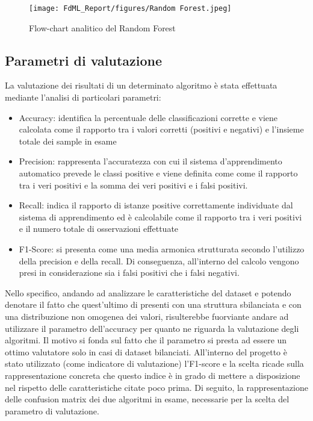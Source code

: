 \documentclass[10pt,a4paper]{article}
\begin{document}
 \begin{figure}[ht]
     \centering
     \texttt{[image: FdML\_Report/figures/Random Forest.jpeg]}
     \caption{Flow-chart analitico del Random Forest}
     \label{fig:my_label}
 \end{figure}
 \clearpage
 
 \subsection{Parametri di valutazione}
 La valutazione dei risultati di un determinato algoritmo è stata effettuata mediante l'analisi di particolari parametri:
 
 \begin{itemize}
     \item Accuracy: identifica la percentuale delle classificazioni corrette e viene calcolata come il rapporto tra i valori corretti (positivi e negativi) e l'insieme totale dei sample in esame
 \end{itemize}
 
 \begin{itemize}
     \item Precision: rappresenta l’accuratezza con cui il sistema d'apprendimento automatico prevede le classi positive e viene definita come  come il rapporto tra i veri positivi e la somma dei veri positivi e i falsi positivi.
 \end{itemize}
 
 \begin{itemize}
     \item Recall: indica il rapporto di istanze positive correttamente individuate dal sistema di apprendimento ed è calcolabile come il rapporto tra i veri positivi e il numero totale di osservazioni effettuate
 \end{itemize}
 
 \begin{itemize}
     \item F1-Score: si presenta come una media armonica strutturata secondo l'utilizzo della precision e della recall. \hfill \break
     Di conseguenza, all'interno del calcolo vengono presi in considerazione sia i falsi positivi che i falsi negativi.
 \end{itemize}

Nello specifico, andando ad analizzare le caratteristiche del dataset e potendo denotare il fatto che quest'ultimo di presenti con una struttura sbilanciata e con una distribuzione non omogenea dei valori, risulterebbe fuorviante andare ad utilizzare il parametro dell'accuracy per quanto ne riguarda la valutazione degli algoritmi.\hfill \break
Il motivo si fonda sul fatto che il parametro si presta ad essere un ottimo valutatore solo in casi di dataset bilanciati.\hfill \break
All'interno del progetto è stato utilizzato (come indicatore di valutazione) l'F1-score e la scelta ricade sulla rappresentazione concreta che questo indice è in grado di mettere a disposizione nel rispetto delle caratteristiche citate poco prima.
Di seguito, la rappresentazione delle confusion matrix dei due algoritmi in esame, necessarie per la scelta del parametro di valutazione.
\end{document}
